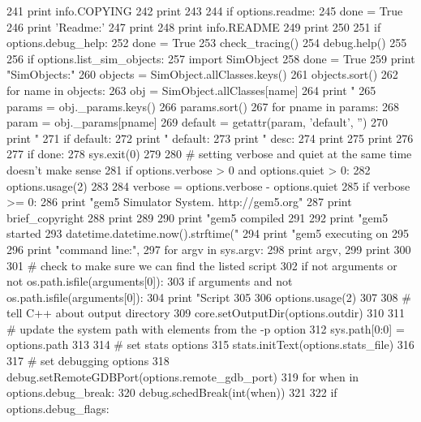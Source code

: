 \begin{DoxyCode}
241         print info.COPYING
242         print
243 
244     if options.readme:
245         done = True
246         print 'Readme:'
247         print
248         print info.README
249         print
250 
251     if options.debug_help:
252         done = True
253         check_tracing()
254         debug.help()
255 
256     if options.list_sim_objects:
257         import SimObject
258         done = True
259         print "SimObjects:"
260         objects = SimObject.allClasses.keys()
261         objects.sort()
262         for name in objects:
263             obj = SimObject.allClasses[name]
264             print "    %
265             params = obj._params.keys()
266             params.sort()
267             for pname in params:
268                 param = obj._params[pname]
269                 default = getattr(param, 'default', '')
270                 print "        %
271                 if default:
272                     print "            default: %
273                 print "            desc: %
274                 print
275             print
276 
277     if done:
278         sys.exit(0)
279 
280     # setting verbose and quiet at the same time doesn't make sense
281     if options.verbose > 0 and options.quiet > 0:
282         options.usage(2)
283 
284     verbose = options.verbose - options.quiet
285     if verbose >= 0:
286         print "gem5 Simulator System.  http://gem5.org"
287         print brief_copyright
288         print
289 
290         print "gem5 compiled %
291 
292         print "gem5 started %
293             datetime.datetime.now().strftime("%
294         print "gem5 executing on %
295 
296         print "command line:",
297         for argv in sys.argv:
298             print argv,
299         print
300 
301     # check to make sure we can find the listed script
302     if not arguments or not os.path.isfile(arguments[0]):
303         if arguments and not os.path.isfile(arguments[0]):
304             print "Script %
305 
306         options.usage(2)
307 
308     # tell C++ about output directory
309     core.setOutputDir(options.outdir)
310 
311     # update the system path with elements from the -p option
312     sys.path[0:0] = options.path
313 
314     # set stats options
315     stats.initText(options.stats_file)
316 
317     # set debugging options
318     debug.setRemoteGDBPort(options.remote_gdb_port)
319     for when in options.debug_break:
320         debug.schedBreak(int(when))
321 
322     if options.debug_flags:

\end{DoxyCode}
